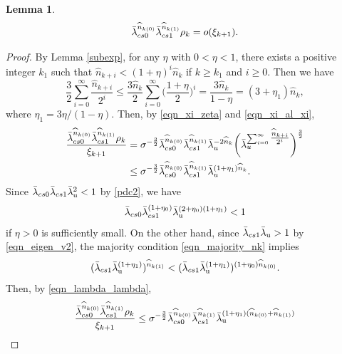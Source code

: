 \documentclass{amsart}
\newtheorem{lem}[thm]{Lemma}
\theoremstyle{definition}
\numberwithin{equation}{section}
\numberwithin{figure}{section}
\begin{document}
\begin{lem}\label{lem7.3}
$$
\bar\lambda_{\rm cs0}^{\widehat n_{k(0)}}\bar\lambda_{\rm cs1}^{\widehat n_{k(1)}}\rho_{k}=o(\xi_{k+1}).
$$
\end{lem}
\begin{proof}
By Lemma \ref{subexp},  for any $\eta$ with $0<\eta<1$, there exists a positive integer $k_1$ such that 
$\widehat n_{k+i}<(1+\eta)^i\widehat n_{k}$ if $k\geq k_1$ and $i\geq 0$.
Then we have 
$$
\frac{3}{2}\sum_{i=0}^{\infty}\frac{\widehat n_{k+i}}{2^{i}}
\leq 
\frac{3\widehat n_{k}}{2}\sum_{i=0}^{\infty}
\biggl(\frac{1+\eta}{2}\biggr)^{i}
=\frac{3\widehat n_{k}}{1-\eta}=(3+\eta_{1})\widehat n_{k},
$$
where $\eta_{1}=3\eta/(1-\eta)$.
Then, by \eqref{eqn_xi_zeta} and \eqref{eqn_xi_al_xi}, 
\begin{equation}\label{eqn_lambda_lambda}
\begin{split}
\frac{ \bar\lambda_{\rm cs0}^{\widehat n_{k(0)}}\bar\lambda_{\rm cs1}^{\widehat n_{k(1)}}\rho_{k}}
{\xi_{k+1}}
&=
\sigma^{-\frac{3}{2}} \bar\lambda_{\rm cs0}^{\widehat n_{k(0)}}\bar\lambda_{\rm cs1}^{\widehat n_{k(1)}} \bar{\lambda}_{\rm u}^{-2 \widehat n_{k}}
\biggl(\bar{\lambda}_{\rm u}^
{\sum_{i=0}^{\infty}\tfrac{\widehat n_{k+i}}{2^{i}}}
\biggr)^{\frac{3}{2}}\\
&\leq \sigma^{-\frac{3}{2}} \bar\lambda_{\rm cs0}^{\widehat n_{k(0)}}\bar\lambda_{\rm cs1}^{\widehat n_{k(1)}} \bar{\lambda}_{\rm u}^{(1+\eta_1)\widehat n_{k}}.
\end{split}
\end{equation}
Since 
$\bar\lambda_{\rm cs0}\bar\lambda_{\rm cs1}\bar\lambda_{\mathrm{u}}^{2}<1$ 
by \eqref{pdc2}, we have 
$$\bar\lambda_{\rm cs0}\bar\lambda_{\rm cs1}^{(1+\eta_0)}\bar\lambda_{\mathrm{u}}^{(2+\eta_0)(1+\eta_1)}<1$$
if $\eta>0$ is sufficiently small.
On the other hand, since $\bar\lambda_{\rm cs1}\bar\lambda_{\mathrm{u}}>1$ by \eqref{eqn_eigen_v2}, 
the majority condition \eqref{eqn_majority_nk} implies  
$$(\bar\lambda_{\rm cs1}\bar\lambda_{\mathrm{u}}^{(1+\eta_{1})})^{\widehat n_{k(1)}}
< (\bar\lambda_{\rm cs1}\bar\lambda_{\mathrm{u}}^{(1+\eta_{1})})^{(1+\eta_0)\widehat n_{k(0)}}.
$$
Then, by \eqref{eqn_lambda_lambda},   
\begin{align*}
\frac{\bar\lambda_{\rm cs0}^{\widehat n_{k(0)}}\bar\lambda_{\rm cs1}^{\widehat n_{k(1)}}\rho_{k}}{\xi_{k+1}}
&
\leq 
\sigma^{-\frac32} 
\bar\lambda_{\rm cs0}^{\widehat n_{k(0)}}
\bar\lambda_{\rm cs1}^{\widehat n_{k(1)}}
\bar\lambda_{\mathrm{u}}^{(1+\eta_{1})(\widehat n_{k(0)}+\widehat n_{k(1)})}\\

\end{align*}
\end{proof}
\end{document}
